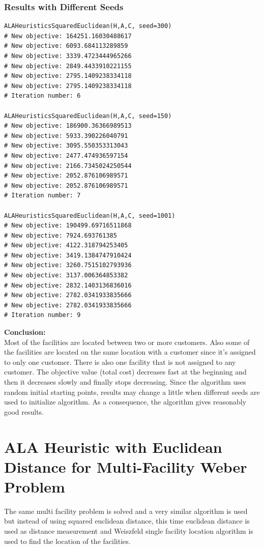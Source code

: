 \documentclass[12pt]{article}
\begin{document}
\subsubsection*{Results with Different Seeds}
\begin{lstlisting}[style=pythonstyle]
ALAHeuristicsSquaredEuclidean(H,A,C, seed=300)
# New objective: 164251.16030488617
# New objective: 6093.684113289859
# New objective: 3339.4723444965266
# New objective: 2849.4433910221155
# New objective: 2795.1409238334118
# New objective: 2795.1409238334118
# Iteration number: 6

ALAHeuristicsSquaredEuclidean(H,A,C, seed=150)
# New objective: 186900.36366989513
# New objective: 5933.390226040791
# New objective: 3095.550353313043
# New objective: 2477.474936597154
# New objective: 2166.7345024250544
# New objective: 2052.876106989571
# New objective: 2052.876106989571
# Iteration number: 7

ALAHeuristicsSquaredEuclidean(H,A,C, seed=1001)
# New objective: 190499.69716511868
# New objective: 7924.693761385
# New objective: 4122.318794253405
# New objective: 3419.1384747910424
# New objective: 3260.7515102793936
# New objective: 3137.006364853382
# New objective: 2832.1403136836016
# New objective: 2782.0341933835666
# New objective: 2782.0341933835666
# Iteration number: 9
\end{lstlisting}

\FloatBarrier
\textbf{Conclusion:}\\
Most of the facilities are located between two or more customers. Also some of the facilities are located on the same location with a customer since it's assigned to only one customer. There is also one facility that is not assigned to any customer. The objective value (total cost) decreases fast at the beginning and then it decreases slowly and finally stops decreasing. Since the algorithm uses random initial starting points, results may change a little when different seeds are used to initialize algorithm. As a consequence, the algorithm gives reasonably good results.

\section{ALA Heuristic with Euclidean Distance for Multi-Facility Weber Problem}

The same multi facility problem is solved and a very similar algorithm is used but instead of using squared euclidean distance, this time euclidean distance is used as distance measurement and Weiszfeld single facility location algorithm is used to find the location of the facilities.
\end{document}
